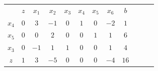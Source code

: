 \begin{frame}
	{
		\begin{table}
			\begin{tabular}{c c c c c c c c c c c c}
				& \cellcolor{blue!80} \color{white} $ \scriptstyle z$
				& \cellcolor{blue!80} \color{white} $ \scriptstyle x_1$ 
				& \cellcolor{blue!80} \color{white} $ \scriptstyle x_2$
				& \cellcolor{blue!80} \color{red} $ \scriptstyle x_3$
				& \cellcolor{blue!80} \color{red} $ \scriptstyle x_4$
				& \cellcolor{blue!80} \color{red} $ \scriptstyle x_5$
				& \cellcolor{blue!80} \color{white} $ \scriptstyle x_6$ 
				& \cellcolor{blue!80} \color{white} $ \scriptstyle b$ \\
				\cellcolor{blue!80} \color{red} $ \scriptstyle x_4$
				& \cellcolor{yellow!60}  $ \scriptstyle 0$
				& \cellcolor{yellow!60}  $ \scriptstyle 3$ 
				& \cellcolor{yellow!60}  $ \scriptstyle -1$
				& \cellcolor{yellow!60}  $ \scriptstyle 0$
				& \cellcolor{yellow!60}  $ \scriptstyle 1$
				& \cellcolor{yellow!60}  $ \scriptstyle 0$
				& \cellcolor{yellow!60}  $ \scriptstyle -2$ 
				& \cellcolor{yellow!60}  $ \scriptstyle 1$ \\ 
				\cellcolor{blue!80} \color{red} $ \scriptstyle x_5$  
				& \cellcolor{yellow!60}  $ \scriptstyle 0$
				& \cellcolor{yellow!60}  $ \scriptstyle 0$ 
				& \cellcolor{yellow!60}  $ \scriptstyle 2$
				& \cellcolor{yellow!60}  $ \scriptstyle 0$
				& \cellcolor{yellow!60}  $ \scriptstyle 0$
				& \cellcolor{yellow!60}  $ \scriptstyle 1$
				& \cellcolor{yellow!60}  $ \scriptstyle 1$ 
				& \cellcolor{yellow!60}  $ \scriptstyle 6$ \\
				\cellcolor{blue!80} \color{red} $ \scriptstyle x_3$
				& \cellcolor{yellow!60}  $ \scriptstyle 0$
				& \cellcolor{yellow!60}  $ \scriptstyle -1$ 
				& \cellcolor{yellow!60}  $ \scriptstyle 1$
				& \cellcolor{yellow!60}  $ \scriptstyle 1$
				& \cellcolor{yellow!60}  $ \scriptstyle 0$
				& \cellcolor{yellow!60}  $ \scriptstyle 0$
				& \cellcolor{yellow!60}  $ \scriptstyle 1$ 
				& \cellcolor{yellow!60}  $ \scriptstyle 4$ \\
				\cellcolor{blue!80} \color{white} $ \scriptstyle z$
				& \cellcolor{yellow!60}  $ \scriptstyle 1$
				& \cellcolor{yellow!60}  $ \scriptstyle 3$ 
				& \cellcolor{yellow!60}  $ \scriptstyle -5$
				& \cellcolor{yellow!60}  $ \scriptstyle 0$
				& \cellcolor{yellow!60}  $ \scriptstyle 0$
				& \cellcolor{yellow!60}  $ \scriptstyle 0$
				& \cellcolor{yellow!60}  $ \scriptstyle -4$ 
				& \cellcolor{yellow!60}  $ \scriptstyle 16$ \\
			\end{tabular}

\end{table}}
\end{frame}
